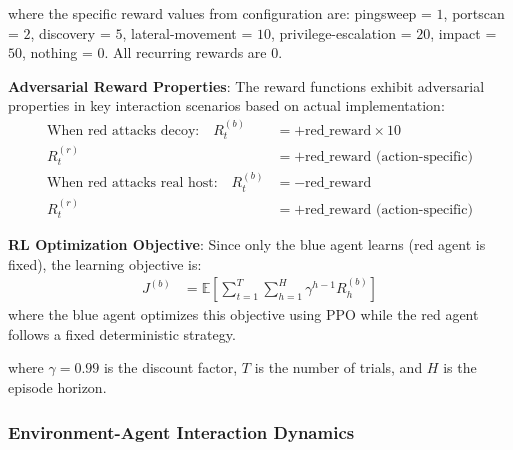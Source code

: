 \documentclass[12pt,oneside]{article}
\begin{document}
where the specific reward values from configuration are: pingsweep = $1$, portscan = $2$, discovery = $5$, lateral-movement = $10$, privilege-escalation = $20$, impact = $50$, nothing = $0$. All recurring rewards are $0$.

\textbf{Adversarial Reward Properties}:
The reward functions exhibit adversarial properties in key interaction scenarios based on actual implementation:
\begin{align}
\text{When red attacks decoy:} \quad R_t^{(b)} &= +\text{red\_reward} \times 10 \\
R_t^{(r)} &= +\text{red\_reward} \text{ (action-specific)} \\
\text{When red attacks real host:} \quad R_t^{(b)} &= -\text{red\_reward} \\
R_t^{(r)} &= +\text{red\_reward} \text{ (action-specific)}
\end{align}

\textbf{RL Optimization Objective}:
Since only the blue agent learns (red agent is fixed), the learning objective is:
\begin{align}
J^{(b)} &= \mathbb{E}\left[\sum_{t=1}^{T} \sum_{h=1}^{H} \gamma^{h-1} R_h^{(b)}\right]
\end{align}
where the blue agent optimizes this objective using PPO while the red agent follows a fixed deterministic strategy.

where $\gamma = 0.99$ is the discount factor, $T$ is the number of trials, and $H$ is the episode horizon.

\subsubsection{Environment-Agent Interaction Dynamics}
\end{document}
